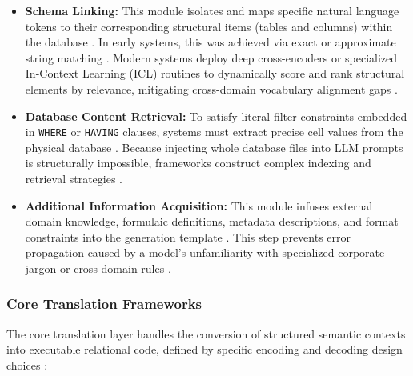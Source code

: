 \begin{itemize}
   \item \textbf{Schema Linking:} This module isolates and maps specific natural language tokens to their corresponding structural items (tables and columns) within the database \cite{Text_to_SQL_in_the_Era_of_LLMs}. In early systems, this was achieved via exact or approximate string matching \cite{Text_to_SQL_in_the_Era_of_LLMs}. Modern systems deploy deep cross-encoders or specialized In-Context Learning (ICL) routines to dynamically score and rank structural elements by relevance, mitigating cross-domain vocabulary alignment gaps \cite{Text_to_SQL_in_the_Era_of_LLMs}.
   \item \textbf{Database Content Retrieval:} To satisfy literal filter constraints embedded in \texttt{WHERE} or \texttt{HAVING} clauses, systems must extract precise cell values from the physical database \cite{Text_to_SQL_in_the_Era_of_LLMs}. Because injecting whole database files into LLM prompts is structurally impossible, frameworks construct complex indexing and retrieval strategies \cite{Text_to_SQL_in_the_Era_of_LLMs}.
   \item \textbf{Additional Information Acquisition:} This module infuses external domain knowledge, formulaic definitions, metadata descriptions, and format constraints into the generation template \cite{Text_to_SQL_in_the_Era_of_LLMs}. This step prevents error propagation caused by a model's unfamiliarity with specialized corporate jargon or cross-domain rules \cite{Text_to_SQL_in_the_Era_of_LLMs}.
\end{itemize}

\subsubsection{Core Translation Frameworks}
The core translation layer handles the conversion of structured semantic contexts into executable relational code,
defined by specific encoding and decoding design choices \cite{Text_to_SQL_in_the_Era_of_LLMs}:

